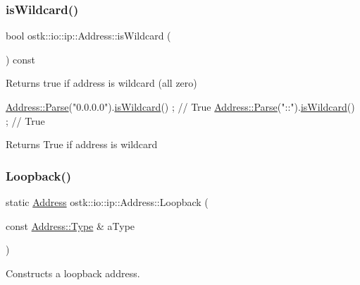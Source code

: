 \subsubsection{\texorpdfstring{is\+Wildcard()}{isWildcard()}}
{\footnotesize\ttfamily bool ostk\+::io\+::ip\+::\+Address\+::is\+Wildcard (\begin{DoxyParamCaption}{ }\end{DoxyParamCaption}) const}



Returns true if address is wildcard (all zero) 


\begin{DoxyCode}
\hyperlink{classostk_1_1io_1_1ip_1_1_address_a3d60e44d816e30f17db36f9bb7ac6307}{Address::Parse}(\textcolor{stringliteral}{"0.0.0.0"}).\hyperlink{classostk_1_1io_1_1ip_1_1_address_ae099697de04ec30bac8f9d371ec02e14}{isWildcard}() ; \textcolor{comment}{// True}
\hyperlink{classostk_1_1io_1_1ip_1_1_address_a3d60e44d816e30f17db36f9bb7ac6307}{Address::Parse}(\textcolor{stringliteral}{"::"}).\hyperlink{classostk_1_1io_1_1ip_1_1_address_ae099697de04ec30bac8f9d371ec02e14}{isWildcard}() ; \textcolor{comment}{// True}
\end{DoxyCode}


\begin{DoxyReturn}{Returns}
True if address is wildcard 
\end{DoxyReturn}
\mbox{\label{classostk_1_1io_1_1ip_1_1_address_af632da7f131b2a6649d2927ebb6ba60c}} 
\subsubsection{\texorpdfstring{Loopback()}{Loopback()}}
{\footnotesize\ttfamily static \hyperlink{classostk_1_1io_1_1ip_1_1_address}{Address} ostk\+::io\+::ip\+::\+Address\+::\+Loopback (\begin{DoxyParamCaption}\item[{const \hyperlink{classostk_1_1io_1_1ip_1_1_address_a03b78ae8f7ddbb893d7396e6a1baf695}{Address\+::\+Type} \&}]{a\+Type }\end{DoxyParamCaption})\hspace{0.3cm}{\ttfamily [static]}}



Constructs a loopback address. 



